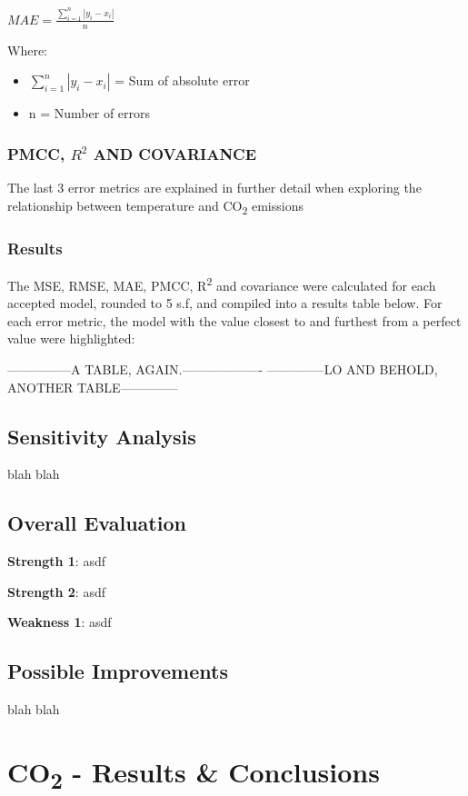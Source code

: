 \documentclass{mcmthesis}
\begin{document}
    ${\displaystyle {MAE} ={\frac {\sum _{i=1}^{n}\left|y_{i}-x_{i}\right|}{n}}}$

    Where:
    \begin{itemize}
        \item ${\sum _{i=1}^{n}\left|y_{i}-x_{i}\right|}$ = Sum of absolute error
        \item {n} = Number of errors
    \end{itemize}

    \subsubsection{PMCC, ${R^2}$ AND COVARIANCE}
    The last 3 error metrics are explained in further detail when exploring the relationship between temperature and CO\textsubscript{2} emissions

    \subsubsection{Results}
    The MSE, RMSE, MAE, PMCC, R\textsuperscript{2} and covariance were calculated for each accepted model, rounded to 5 s.f, and compiled into a results table below. For each error metric, the model with the value closest to and furthest from a perfect value were highlighted:

    ---------------A TABLE, AGAIN.-------------------
    --------------LO AND BEHOLD, ANOTHER TABLE--------------

    \subsection{Sensitivity Analysis}
    blah blah

    \subsection{Overall Evaluation}

    \noindent\textbf{Strength 1}: asdf

    \noindent\textbf{Strength 2}: asdf

    \noindent\textbf{Weakness 1}: asdf

    \subsection{Possible Improvements}
    blah blah

    \newpage


    \section{CO\textsubscript{2} - Results \& Conclusions}
\end{document}
